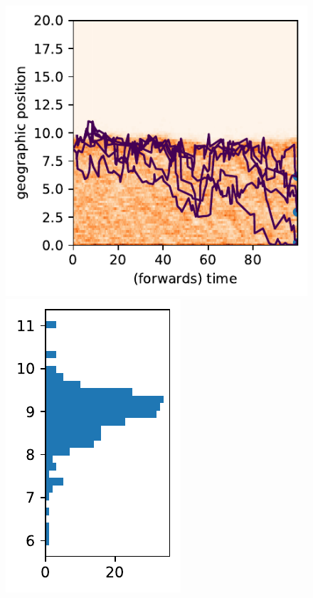 \documentclass[12pt]{article}
\begin{document}
\begin{figure}
\begin{center}
        \includegraphics{figures/ex3_pme/pme_123.lineages}
        \includegraphics{figures/ex3_pme/pme_123.lineagehist}

\end{center}
\end{figure}
\end{document}
